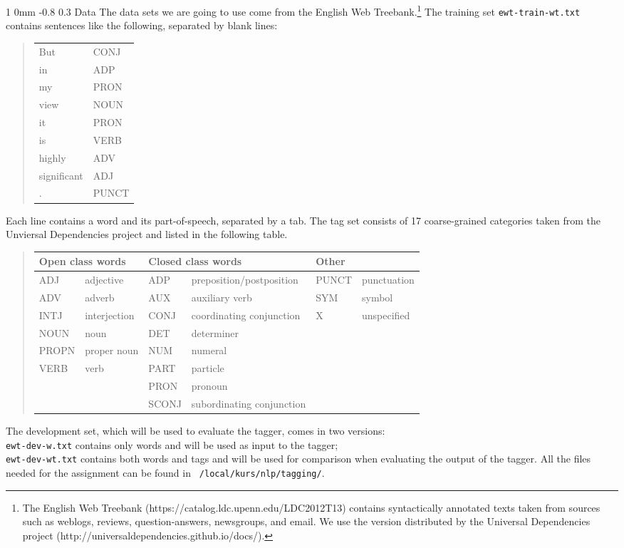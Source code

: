 \documentclass[11pt]{article}
\makeatletter
\newcommand{\newsec}[2]{\section{#1}\label{sec:#2}\noindent}
\renewcommand{\section}{\@startsection
{section}%
{1}%
{0mm}%
{-0.8\baselineskip}%
{0.3\baselineskip}%
{\bfseries\large}}%
\makeatother
\begin{document}
\newsec{Data}{data}%
The data sets we are going to use come from the English Web
Treebank.\footnote{The English Web Treebank
  (https://catalog.ldc.upenn.edu/LDC2012T13) contains syntactically
  annotated texts taken from sources such as weblogs, reviews,
  question-answers, newsgroups, and email.  We use the version
  distributed by the Universal Dependencies project
  (http://universaldependencies.github.io/docs/).} The training set
{\tt ewt-train-wt.txt} contains sentences like the following,
separated by blank lines:
\begin{quote}
\begin{tt}
\begin{tabular}{ll}
But          &CONJ\\
in            &ADP\\
my            &PRON\\
view          &NOUN\\
it            &PRON\\
is            &VERB\\
highly        &ADV\\
significant   &ADJ\\
.             &PUNCT\\
\end{tabular}
\end{tt}
\end{quote}
Each line contains a word and its part-of-speech, separated by a
tab. The tag set consists of 17 coarse-grained categories taken from
the Unviersal Dependencies project and listed in the following table.
	\begin{quote}
	\renewcommand{\tabcolsep}{4pt}
	\begin{tabular}{|ll|ll|ll|}
	\hline
	\multicolumn{2}{|l|}{{\bf Open class words}} & \multicolumn{2}{l|}{{\bf Closed class words}} & \multicolumn{2}{l|}{{\bf Other}} \\
	\hline
	ADJ & adjective & ADP & preposition/postposition & PUNCT & punctuation\\
	ADV & adverb & AUX & auxiliary verb & SYM & symbol \\
	INTJ & interjection & CONJ & coordinating conjunction & X & unspecified \\
	NOUN & noun & DET & determiner & & \\
	PROPN & proper noun & NUM & numeral & & \\
	VERB & verb & PART & particle  & & \\
	 & & PRON & pronoun & & \\
	 & & SCONJ & subordinating conjunction & & \\
	\hline
	\end{tabular}
	\end{quote}
        The development set, which will be used to evaluate the tagger, comes in two versions:\\ {\tt ewt-dev-w.txt} contains only words and will be used as input to the tagger;\\
        {\tt ewt-dev-wt.txt} contains both words and tags and will be
        used for comparison when evaluating the output of the tagger.
        All the files needed for the assignment can be found in {\tt
          /local/kurs/nlp/tagging/}.
\end{document}
